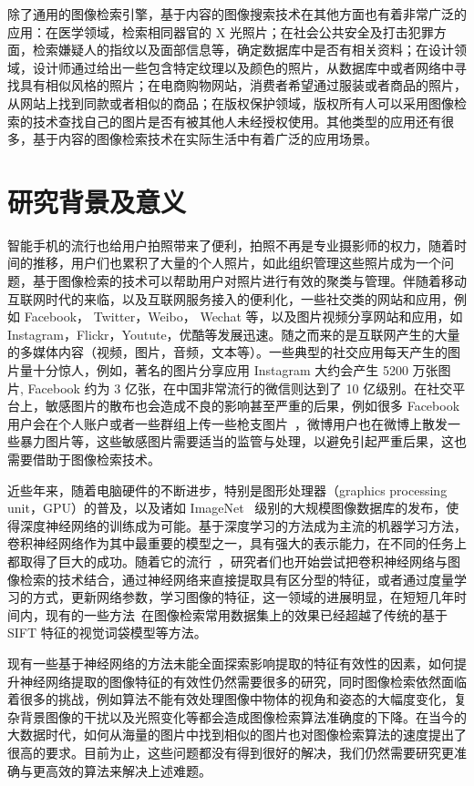 除了通用的图像检索引擎，基于内容的图像搜索技术在其他方面也有着非常广泛的应用：在医学领域，检索相同器官的 X 光照片；在社会公共安全及打击犯罪方面，检索嫌疑人的指纹以及面部信息等，确定数据库中是否有相关资料；在设计领域，设计师通过给出一些包含特定纹理以及颜色的照片，从数据库中或者网络中寻找具有相似风格的照片；在电商购物网站，消费者希望通过服装或者商品的照片，从网站上找到同款或者相似的商品；在版权保护领域，版权所有人可以采用图像检索的技术查找自己的图片是否有被其他人未经授权使用。其他类型的应用还有很多，基于内容的图像检索技术在实际生活中有着广泛的应用场景。

\section{研究背景及意义}
智能手机的流行也给用户拍照带来了便利，拍照不再是专业摄影师的权力，随着时间的推移，用户们也累积了大量的个人照片，如此组织管理这些照片成为一个问题，基于图像检索的技术可以帮助用户对照片进行有效的聚类与管理。伴随着移动互联网时代的来临，以及互联网服务接入的便利化，一些社交类的网站和应用，例如 Facebook， Twitter，Weibo， Wechat 等，以及图片视频分享网站和应用，如 Instagram，Flickr，Youtute，优酷等发展迅速。随之而来的是互联网产生的大量的多媒体内容（视频，图片，音频，文本等）。一些典型的社交应用每天产生的图片量十分惊人，例如，著名的图片分享应用 Instagram 大约会产生 5200 万张图片, Facebook 约为 3 亿张，在中国非常流行的微信则达到了 10 亿级别。在社交平台上，敏感图片的散布也会造成不良的影响甚至严重的后果，例如很多 Facebook 用户会在个人账户或者一些群组上传一些枪支图片~\cite{Drange2016}，微博用户也在微博上散发一些暴力图片等，这些敏感图片需要适当的监管与处理，以避免引起严重后果，这也需要借助于图像检索技术。

近些年来，随着电脑硬件的不断进步，特别是图形处理器（graphics processing unit，GPU）的普及，以及诸如 ImageNet~\cite{Russakovsky2015ImageNetLS} 级别的大规模图像数据库的发布，使得深度神经网络的训练成为可能。基于深度学习的方法成为主流的机器学习方法，卷积神经网络作为其中最重要的模型之一，具有强大的表示能力，在不同的任务上都取得了巨大的成功。随着它的流行~\cite{Krizhevsky2012ImageNetCW}，研究者们也开始尝试把卷积神经网络与图像检索的技术结合，通过神经网络来直接提取具有区分型的特征，或者通过度量学习的方式，更新网络参数，学习图像的特征，这一领域的进展明显，在短短几年时间内，现有的一些方法~\cite{Gordo2016DeepIR}在图像检索常用数据集上的效果已经超越了传统的基于 SIFT 特征的视觉词袋模型等方法。

现有一些基于神经网络的方法未能全面探索影响提取的特征有效性的因素，如何提升神经网络提取的图像特征的有效性仍然需要很多的研究，同时图像检索依然面临着很多的挑战，例如算法不能有效处理图像中物体的视角和姿态的大幅度变化，复杂背景图像的干扰以及光照变化等都会造成图像检索算法准确度的下降。在当今的大数据时代，如何从海量的图片中找到相似的图片也对图像检索算法的速度提出了很高的要求。目前为止，这些问题都没有得到很好的解决，我们仍然需要研究更准确与更高效的算法来解决上述难题。

